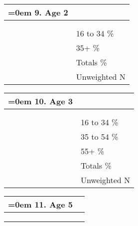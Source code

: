\documentclass{article}
\newcommand{\longtablesep}{\endfirsthead \multicolumn{2}{c}{\textit{}} \\ \endhead \multicolumn{2}{c}{\textit{}} \\ \endfoot \endlastfoot}
\newcommand{\formatvardescription}[1]{#1}
\begin{document}
{\begin{center}
\begin{longtable}{p{0.3in}p{5.5in}}
\end{longtable}
\end{center}
\clearpage


\begin{center}
\begin{longtable}{p{0.3in}p{5.5in}}
\addcontentsline{lot}{table}{ 9. Age 2}
\hangindent=0em \parbox{6.5in}{
\formatvardescription{9. Age 2}} \\
\longtablesep

& 16 to 34 \hspace*{0.15em} \% \\
& 35+ \hspace*{0.15em} \% \\
& Totals \hspace*{0.15em} \% \\
& Unweighted N \hspace*{0.15em}  \\

\end{longtable}
\end{center}
\clearpage


\begin{center}
\begin{longtable}{p{0.3in}p{5.5in}}
\addcontentsline{lot}{table}{ 10. Age 3}
\hangindent=0em \parbox{6.5in}{
\formatvardescription{10. Age 3}} \\
\longtablesep

& 16 to 34 \hspace*{0.15em} \% \\
& 35 to 54 \hspace*{0.15em} \% \\
& 55+ \hspace*{0.15em} \% \\
& Totals \hspace*{0.15em} \% \\
& Unweighted N \hspace*{0.15em}  \\

\end{longtable}
\end{center}
\clearpage


\begin{center}
\begin{longtable}{p{0.3in}p{5.5in}}
\addcontentsline{lot}{table}{ 11. Age 5}
\hangindent=0em \parbox{6.5in}{
\formatvardescription{11. Age 5}} \\
\longtablesep


\end{longtable}
\end{center}}
\end{document}
